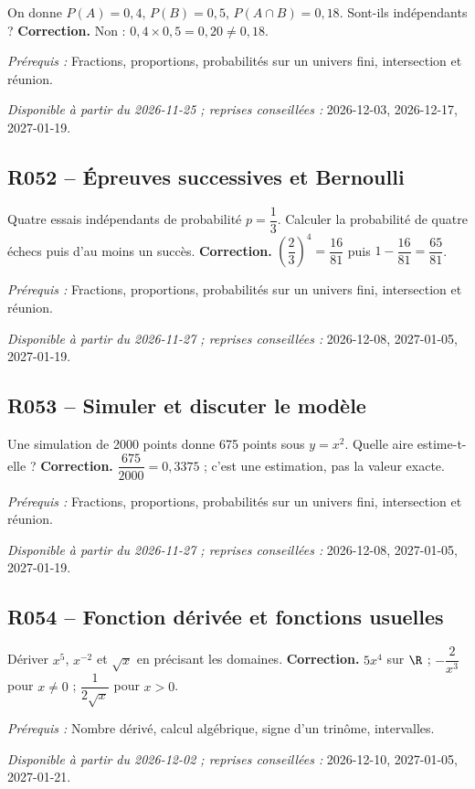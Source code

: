 On donne $P(A)=0{,}4$, $P(B)=0{,}5$, $P(A\cap B)=0{,}18$. Sont-ils indépendants ?
\ifprof\textbf{Correction.} Non : $0{,}4\times0{,}5=0{,}20\ne0{,}18$.\par\textit{Prérequis :} Fractions, proportions, probabilités sur un univers fini, intersection et réunion.\par\textit{Disponible à partir du 2026-11-25 ; reprises conseillées :} 2026-12-03, 2026-12-17, 2027-01-19.\fi
{}\subsection*{R052 -- Épreuves successives et Bernoulli}\label{R052}
Quatre essais indépendants de probabilité $p=\dfrac{1}{3}$. Calculer la probabilité de quatre échecs puis d’au moins un succès.
\ifprof\textbf{Correction.} $(\dfrac{2}{3})^4=\dfrac{16}{81}$ puis $1-\dfrac{16}{81}=\dfrac{65}{81}$.\par\textit{Prérequis :} Fractions, proportions, probabilités sur un univers fini, intersection et réunion.\par\textit{Disponible à partir du 2026-11-27 ; reprises conseillées :} 2026-12-08, 2027-01-05, 2027-01-19.\fi
{}\subsection*{R053 -- Simuler et discuter le modèle}\label{R053}
Une simulation de 2000 points donne 675 points sous $y=x^2$. Quelle aire estime-t-elle ?
\ifprof\textbf{Correction.} $\dfrac{675}{2000}=0{,}3375$ ; c’est une estimation, pas la valeur exacte.\par\textit{Prérequis :} Fractions, proportions, probabilités sur un univers fini, intersection et réunion.\par\textit{Disponible à partir du 2026-11-27 ; reprises conseillées :} 2026-12-08, 2027-01-05, 2027-01-19.\fi
{}\subsection*{R054 -- Fonction dérivée et fonctions usuelles}\label{R054}
Dériver $x^5$, $x^{-2}$ et $\sqrt x$ en précisant les domaines.
\ifprof\textbf{Correction.} $5x^4$ sur $\R$ ; $-\dfrac{2}{x^3}$ pour $x\ne0$ ; $\dfrac{1}{2\sqrt x}$ pour $x>0$.\par\textit{Prérequis :} Nombre dérivé, calcul algébrique, signe d’un trinôme, intervalles.\par\textit{Disponible à partir du 2026-12-02 ; reprises conseillées :} 2026-12-10, 2027-01-05, 2027-01-21.\fi
